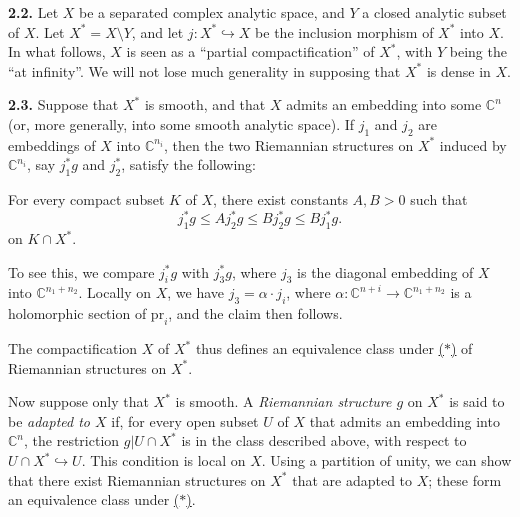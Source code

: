 \documentclass{report}
\newenvironment{itenv*}
  {\phantomsection\par\medskip\noindent\itshape}
  {\medskip}
\newenvironment{rmenv}[1]
  {\phantomsection\par\medskip\noindent\textbf{#1.}\rmfamily}
  {\medskip}
\newcommand{\CC}{\mathbb{C}}
\newcommand{\pr}{\mathrm{pr}}
\renewcommand{\leq}{\leqslant}
\newcommand{\oldpage}[1]{\marginpar{\footnotesize$\Big\vert$ \textit{p.~#1}}}
\begin{document}
\oldpage{61}
\begin{rmenv}{2.2}
\label{II.2.2}
  Let $X$ be a separated complex analytic space, and $Y$ a closed analytic subset of $X$.
  Let $X^*=X\setminus Y$, and let $j\colon X^*\hookrightarrow X$ be the inclusion morphism of $X^*$ into $X$.
  In what follows, $X$ is seen as a ``partial compactification'' of $X^*$, with $Y$ being the ``at infinity''.
  We will not lose much generality in supposing that $X^*$ is dense in $X$.
\end{rmenv}

\begin{rmenv}{2.3}
\label{II.2.3}
  Suppose that $X^*$ is smooth, and that $X$ admits an embedding into some $\CC^n$ (or, more generally, into some smooth analytic space).
  If $j_1$ and $j_2$ are embeddings of $X$ into $\CC^{n_i}$, then the two Riemannian structures on $X^*$ induced by $\CC^{n_i}$, say $j_1^*g$ and $j_2^*$, satisfy the following:

  \begin{itenv*}
  \label{II.2.3.*}
    For every compact subset $K$ of $X$, there exist constants $A,B>0$ such that
    \[
      j_1^*g \leq Aj_2^*g \leq Bj_2^*g \leq Bj_1^*g.
    \tag{$*$}
    \]
    on $K\cap X^*$.
  \end{itenv*}

  To see this, we compare $j_i^*g$ with $j_3^*g$, where $j_3$ is the diagonal embedding of $X$ into $\CC^{n_1+n_2}$.
  Locally on $X$, we have $j_3=\alpha\cdot j_i$, where $\alpha\colon\CC^{n+i}\to\CC^{n_1+n_2}$ is a holomorphic section of $\pr_i$, and the claim then follows.

  The compactification $X$ of $X^*$ thus defines an equivalence class under \hyperref[II.2.3.*]{($*$)} of Riemannian structures on $X^*$.

  Now suppose only that $X^*$ is smooth.
  A \emph{Riemannian structure $g$} on $X^*$ is said to be \emph{adapted to $X$} if, for every open subset $U$ of $X$ that admits an embedding into $\CC^n$, the restriction $g|U\cap X^*$ is in the class described above, with respect to $U\cap X^*\hookrightarrow U$.
  This condition is local on $X$.
  Using a partition of unity, we can show that there exist Riemannian structures on $X^*$ that are adapted to $X$;
  these form an equivalence class under \hyperref[II.2.3.*]{($*$)}.
\end{rmenv}
\end{document}
